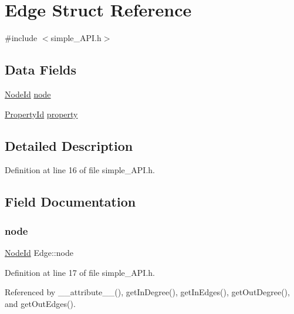 \hypertarget{structEdge}{}\section{Edge Struct Reference}
\label{structEdge}


{\ttfamily \#include $<$simple\+\_\+\+A\+P\+I.\+h$>$}

\subsection*{Data Fields}
\begin{DoxyCompactItemize}
\item 
\hyperlink{first_2common_2simple__API_8h_a6a98126a7f1f23d089864c32a316a6da}{Node\+Id} \hyperlink{structEdge_abee0f2bbeb5aabbfb29d7f90b121ee72}{node}
\item 
\hyperlink{first_2common_2simple__API_8h_a5c6efcf738a88b5e26ce2b06f4008588}{Property\+Id} \hyperlink{structEdge_a827b09ad3a1db278e7a0577ddd0dd4cf}{property}
\end{DoxyCompactItemize}


\subsection{Detailed Description}


Definition at line 16 of file simple\+\_\+\+A\+P\+I.\+h.



\subsection{Field Documentation}
\mbox{\label{structEdge_abee0f2bbeb5aabbfb29d7f90b121ee72}} 
\subsubsection{\texorpdfstring{node}{node}}
{\footnotesize\ttfamily \hyperlink{first_2common_2simple__API_8h_a6a98126a7f1f23d089864c32a316a6da}{Node\+Id} Edge\+::node}



Definition at line 17 of file simple\+\_\+\+A\+P\+I.\+h.



Referenced by \+\_\+\+\_\+attribute\+\_\+\+\_\+(), get\+In\+Degree(), get\+In\+Edges(), get\+Out\+Degree(), and get\+Out\+Edges().

